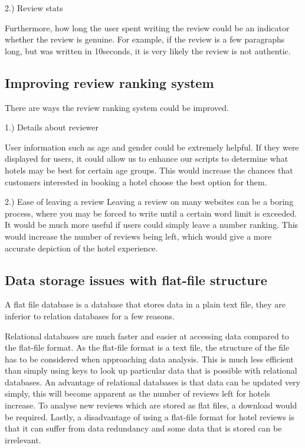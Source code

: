 \documentclass{article}
\begin{document}
2.) Review stats
\newline

Furthermore, how long the user spent writing the review could be an indicator whether the review is genuine. For example, if the review is a few paragraphs long, but was written in 10seconds, it is very likely the review is not authentic.

\subsection{Improving review ranking system}

There are ways the review ranking system could be improved.
\newline

1.) Details about reviewer
\newline

User information such as age and gender could be extremely helpful. If they were displayed for users, it could allow us to enhance our scripts to determine what hotels may be best for certain age groups. This would increase the chances that customers interested in booking a hotel choose the best option for them.
\newline

2.) Ease of leaving a review
\newline
Leaving a review on many websites can be a boring process, where you may be forced to write until a certain word limit is exceeded. It would be much more useful if users could simply leave a number ranking. This would increase the number of reviews being left, which would give a more accurate depiction of the hotel experience.

\subsection{Data storage issues with flat-file structure}

A flat file database is a database that stores data in a plain text file, they are inferior to relation databases for a few reasons.
\newline

Relational databases are much faster and easier at accessing data compared to the flat-file format. As the flat-file format is a text file, the structure of the file has to be considered when approaching data analysis. This is much less efficient than simply using keys to look up particular data that is possible with relational databases. An advantage of relational databases is that data can be updated very simply, this will become apparent as the number of reviews left for hotels increase. To analyse new reviews which are stored as flat files, a download would be required.
Lastly, a disadvantage of using a flat-file format for hotel reviews is that it can suffer from data redundancy and some data that is stored can be irrelevant.
 
\end{document}
